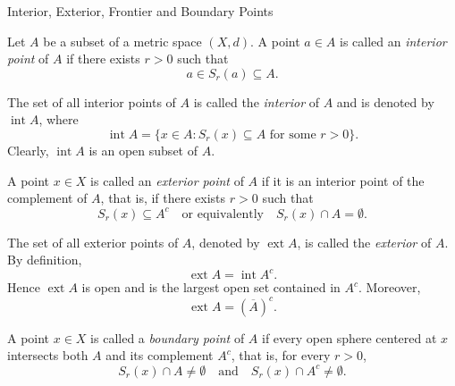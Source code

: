 \documentclass[12pt, a4paper]{article}
\begin{document}
\FrontPage
\Large

\begin{heading}
    Interior, Exterior, Frontier and Boundary Points
\end{heading}

\vspace{10pt}

\begin{definition}
Let $A$ be a subset of a metric space $(X,d)$. A point $a\in A$ is called an
\emph{interior point} of $A$ if there exists $r>0$ such that
\[
a\in S_r(a)\subseteq A.
\]
\end{definition}

\vspace{150pt}

\begin{definition}
The set of all interior points of $A$ is called the \emph{interior} of $A$ and is denoted by
$\operatorname{int}A$, where
\[
\operatorname{int}A=\{x\in A : S_r(x)\subseteq A \text{ for some } r>0\}.
\]
Clearly, $\operatorname{int}A$ is an open subset of $A$.
\end{definition}

\clearpage

\begin{definition}
A point $x\in X$ is called an \emph{exterior point} of $A$ if it is an interior point of the
complement of $A$, that is, if there exists $r>0$ such that
\[
S_r(x)\subseteq A^c
\quad\text{or equivalently}\quad
S_r(x)\cap A=\emptyset.
\]
\end{definition}

\vspace{150pt}

\begin{definition}
The set of all exterior points of $A$, denoted by $\operatorname{ext}A$, is called the
\emph{exterior} of $A$. By definition,
\[
\operatorname{ext}A=\operatorname{int}A^c.
\]
Hence $\operatorname{ext}A$ is open and is the largest open set contained in $A^c$.
Moreover,
\[
\operatorname{ext}A=(\overline{A})^c.
\]
\end{definition}

\clearpage

\begin{definition}
A point $x\in X$ is called a \emph{boundary point} of $A$ if
every open sphere centered at $x$ intersects both $A$ and its complement $A^c$, that is,
for every $r>0$,
\[
S_r(x)\cap A\neq\emptyset
\quad\text{and}\quad
S_r(x)\cap A^c\neq\emptyset.
\]
\end{definition}
\end{document}

